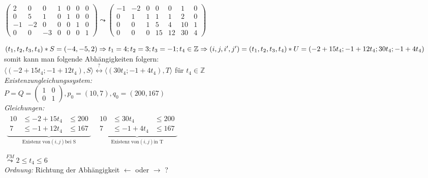 $\left(
\begin{array}{ccc|cccc}
 2 & 0 & 0 & 1 & 0 & 0 & 0 \\
 0 & 5 & 1 & 0 & 1 & 0 & 0 \\
-1 &-2 & 0 & 0 & 0 & 1 & 0 \\
 0 & 0 &-3 & 0 & 0 & 0 & 1
\end{array}
\right) \leadsto \left(
\begin{array}{ccc|cccc}
-1 &-2 & 0 & 0 & 0 & 1 & 0 \\
 0 & 1 & 1 & 1 & 1 & 2 & 0 \\
 0 & 0 & 1 & 5 & 4 &10 & 1 \\
 0 & 0 & 0 &15 &12 &30 & 4
\end{array}
\right)$


$(t_1,t_2,t_3,t_4) * S = (-4, -5, 2) \\
\Rightarrow t_1 = 4; t_2= 3; t_3 = -1; t_4 \in \mathbb{Z} \\
\Rightarrow (i,j,i^\prime,j^\prime) = (t_1,t_2,t_3,t_4) * U =
(-2+15t_4; -1+12t_4; 30t_4; -1+4t_4)$
somit kann man folgende Abhängigkeiten folgern:\\
$\langle (-2 + 15t_4; -1+12t_4), S \rangle \stackrel{?}{\leftrightarrow}
 \langle (30t_4;-1+4t_4), T \rangle$ für $t_4 \in \mathbb{Z}$
~\\
\textit{Existenzungleichungssystem:}\\

$P = Q =
\left(
\begin{array}{cc}
1 & 0 \\
0 & 1
\end{array}
\right), p_0 = (10,7), q_0 = (200,167)$
~\\
\textit{Gleichungen:}\\

$\begin{array}{cc}
\underbrace{
\begin{array}{ccc}
10 &\leq -2+15t_4 &\leq 200 \\
7  &\leq -1+12t_4 &\leq 167
\end{array}
}_{\text{Existenz von} (i,j) \text{bei S}} &
\underbrace{
\begin{array}{ccc}
10 &\leq 30t_4 &\leq 200 \\
 7 &\leq-1+4t_4 &\leq 167
\end{array}
}_{\text{Existenz von} (i,j) \text{in T}}

\end{array}$

$\stackrel{FM}{\leadsto} 2 \leq t_4 \leq 6$
~\\
\textit{Ordnung:} Richtung der Abhängigkeit $\leftarrow$ oder $\rightarrow$ ?\\

